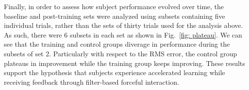 \documentclass[12pt]{article}
\begin{document}
Finally, in order to assess how subject performance evolved over time, the baseline and post-training sets were analyzed using subsets containing five individual trials, rather than the sets of thirty trials used for the analysis above. As such, there were 6 subsets in each set as shown in Fig.~\ref{fig: plateau}. We can see that the training and control groups diverage in performance during the subsets of set 2. Particularly with respect to the RMS error, the control group plateaus in improvement while the training group keeps improving. These results support the hypothesis that subjects experience accelerated learning while receiving feedback through filter-based forceful interaction. 
\end{document}
